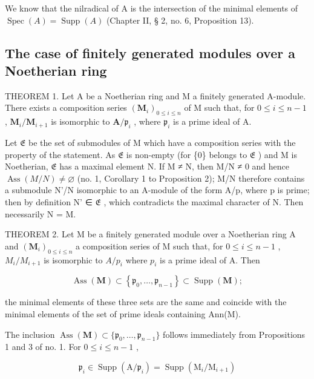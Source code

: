 We know that the nilradical of A is the intersection of the minimal elements of \(\operatorname{Spec}(A) = \operatorname{Supp}(A)\) (Chapter II, § 2, no. 6, Proposition 13).

\subsection{The case of finitely generated modules over a Noetherian ring}

THEOREM 1. Let A be a Noetherian ring and M a finitely generated A-module. There exists a composition series \((\mathbf{M}_i)_{0\leqslant i\leqslant n}\) of M such that, for \(0\leqslant i\leqslant n - 1\) , \(\mathbf{M}_i / \mathbf{M}_{i + 1}\) is isomorphic to \(\mathbf{A} / \mathfrak{p}_i\) , where \(\mathfrak{p}_i\) is a prime ideal of A.

Let \(\mathfrak{E}\) be the set of submodules of M which have a composition series with the property of the statement. As \(\mathfrak{E}\) is non-empty (for \{0\} belongs to \(\mathfrak{E}\) ) and M is Noetherian, \(\mathfrak{E}\) has a maximal element N. If M ≠ N, then M/N ≠ 0 and hence \(\operatorname{Ass}(M/N) \neq \varnothing\) (no. 1, Corollary 1 to Proposition 2); M/N therefore contains a submodule N'/N isomorphic to an A-module of the form A/p, where p is prime; then by definition N' ∈ \(\mathfrak{E}\) , which contradicts the maximal character of N. Then necessarily N = M.

THEOREM 2. Let M be a finitely generated module over a Noetherian ring A and \((\mathbf{M}_{i})_{0\leqslant i\leqslant n}\) a composition series of M such that, for \(0\leqslant i\leqslant n-1\) , \(M_{i}/M_{i+1}\) is isomorphic to \(A/p_{i}\) where \(p_{i}\) is a prime ideal of A. Then

\[
\operatorname{Ass} (\mathbf {M}) \subset \left\{\mathfrak {p} _ {0}, \dots , \mathfrak {p} _ {n - 1} \right\} \subset \operatorname{Supp} (\mathbf {M});\tag{4}
\]

the minimal elements of these three sets are the same and coincide with the minimal elements of the set of prime ideals containing Ann(M).

The inclusion \(\operatorname{Ass}(\mathbf{M}) \subset \{\mathfrak{p}_0, \ldots, \mathfrak{p}_{n-1}\}\) follows immediately from Propositions 1 and 3 of no. 1. For \(0 \leqslant i \leqslant n - 1\) ,

\[
\mathfrak {p} _ {i} \in \operatorname{Supp} (\mathrm{A} / \mathfrak {p} _ {i}) = \operatorname{Supp} (\mathrm{M} _ {i} / \mathrm{M} _ {i + 1})
\]

